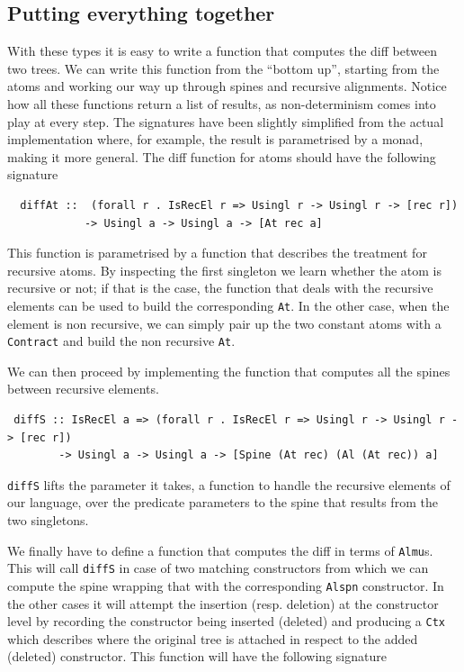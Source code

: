 \documentclass[11pt]{article}
\begin{document}
\subsection{Putting everything together}\label{putting everything together}

With these types it is easy to write a function that computes the diff between 
two trees. 
We can write this function from the ``bottom up'',
starting from the atoms and working our way up through spines and recursive alignments. 
Notice how all these functions return a list of results, as non-determinism 
comes into play at every step. The signatures have been slightly simplified from 
the actual implementation where, for example, the result is 
parametrised by a monad, making it more general.
The diff function for atoms should have the following signature
\begin{lstlisting}
  diffAt ::  (forall r . IsRecEl r => Usingl r -> Usingl r -> [rec r])
            -> Usingl a -> Usingl a -> [At rec a]
\end{lstlisting}
This function is parametrised by a function that describes the treatment for 
recursive atoms. By inspecting the first singleton we learn whether the atom is 
recursive or not; if that is the case, the function that deals with the 
recursive elements can be used to build the corresponding \texttt{At}. In the 
other case, when the element is non recursive, we can simply pair up the two 
constant atoms with a \texttt{Contract} and build the non recursive \texttt{At}.

We can then proceed by implementing the function that computes all the spines 
between recursive elements.
\begin{lstlisting}
 diffS :: IsRecEl a => (forall r . IsRecEl r => Usingl r -> Usingl r -> [rec r])
        -> Usingl a -> Usingl a -> [Spine (At rec) (Al (At rec)) a]
\end{lstlisting}
\texttt{diffS} lifts the parameter it takes, a function to handle the 
recursive elements of our language, over the predicate parameters to the spine that results 
from the two singletons.

We finally have to define a function that computes the diff in terms of 
\texttt{Almu}s. This will call \texttt{diffS} in case of two matching constructors from which we can compute
the spine wrapping that with the corresponding \texttt{Alspn} constructor. In the other cases it will 
attempt the insertion (resp. deletion) at the constructor level by recording the constructor being inserted
(deleted) and producing a \texttt{Ctx} which describes where the original tree is attached in respect to
the added (deleted) constructor.
This function will have the following signature
\end{document}
